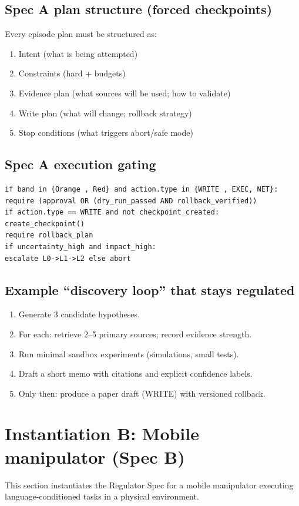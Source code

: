 \documentclass[11pt]{article}
\begin{document}
\subsection{Spec A plan structure (forced checkpoints)}
Every episode plan must be structured as:
\begin{enumerate}
\item Intent (what is being attempted)
\item Constraints (hard + budgets)
\item Evidence plan (what sources will be used; how to validate)
\item Write plan (what will change; rollback strategy)
\item Stop conditions (what triggers abort/safe mode)
\end{enumerate}
\subsection{Spec A execution gating}
\begin{lstlisting}
if band in {Orange , Red} and action.type in {WRITE , EXEC, NET}:
require (approval OR (dry_run_passed AND rollback_verified))
if action.type == WRITE and not checkpoint_created:
create_checkpoint()
require rollback_plan
if uncertainty_high and impact_high:
escalate L0->L1->L2 else abort
\end{lstlisting}
\subsection{Example “discovery loop” that stays regulated}
\begin{enumerate}
\item Generate 3 candidate hypotheses.
\item For each: retrieve 2–5 primary sources; record evidence strength.
\item Run minimal sandbox experiments (simulations, small tests).
\item Draft a short memo with citations and explicit confidence labels.
\item Only then: produce a paper draft (WRITE) with versioned rollback.
\end{enumerate}
\section{Instantiation B: Mobile manipulator (Spec B)}
This section instantiates the Regulator Spec for a mobile manipulator executing language-conditioned
tasks in a physical environment.
\end{document}
